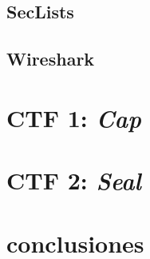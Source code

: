 \documentclass[a4paper, 12pt]{article} %
\begin{document}
\begin{otherlanguage}{spanish}
    \subsection{SecLists}
    

    \subsection{Wireshark}
    \newpage
    \section{\acrshort{CTF} 1: \textit{Cap}}
    

    \newpage
    \section{\acrshort{CTF} 2: \textit{Seal}}
    

    \newpage
    \section{conclusiones}

    \newpage
    \printbibliography[heading=bibnumbered] %

\end{otherlanguage}
\end{document}
